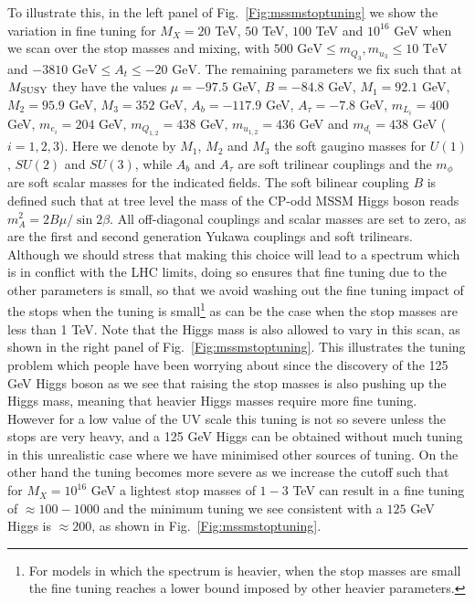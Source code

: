 \documentclass[preprint,amsmath,amssymb,aps,superscriptaddress,prd,showpacs,floatfix,nofootinbib]{revtex4-1}
\begin{document}
To illustrate this, in the left panel of Fig.~\ref{Fig:mssmstoptuning}
we show the variation in fine tuning for $M_X=20$ TeV, $50$ TeV, $100$
TeV and $10^{16}$ GeV when we scan over the stop masses and mixing,
with $500 \textrm{ GeV} \leq m_{Q_3},m_{u_3}\leq 10\textrm{ TeV}$ and
$-3810\textrm{ GeV}\leq A_t\leq -20\textrm{ GeV}$.  The remaining
parameters we fix such that at $M_{\rm SUSY}$ they have the values
$\mu=-97.5$ GeV, $B=-84.8$ GeV, $M_1=92.1$ GeV, $M_2=95.9$ GeV,
$M_3=352$ GeV, $A_b=-117.9$ GeV, $A_\tau=-7.8$ GeV, $m_{L_i}=400$ GeV,
$m_{e_i}=204$ GeV, $m_{Q_{1,2}}=438$ GeV, $m_{u_{1,2}}=436$ GeV and
$m_{d_i}=438$ GeV ($i=1,2,3$). Here we denote by $M_1$, $M_2$ and $M_3$
the soft gaugino masses for $U(1)$, $SU(2)$ and $SU(3)$, while $A_b$ and
$A_\tau$ are soft trilinear couplings and the $m_\phi$ are soft scalar
masses for the indicated fields. The soft bilinear
coupling $B$ is defined such that at tree level the mass of the CP-odd MSSM Higgs boson
reads $m_A^2=2B\mu/\sin 2\beta$. All off-diagonal couplings and scalar masses
are set to zero, as are the first and second generation Yukawa couplings
and soft trilinears. Although we should stress that making
this choice will lead to a spectrum which is in conflict with the LHC
limits, doing so ensures that fine tuning due to the other parameters
is small, so that we avoid washing out the fine tuning impact of the
stops when the tuning is small\footnote{For models in which the
  spectrum is heavier, when the stop masses are small the fine tuning
  reaches a lower bound imposed by other heavier parameters.} as can
be the case when the stop masses are less than 1 TeV.  Note that the
Higgs mass is also allowed to vary in this scan, as shown in the right
panel of Fig.~\ref{Fig:mssmstoptuning}. This illustrates the tuning
problem which people have been worrying about since the discovery of
the 125 GeV Higgs boson as we see that raising the stop masses is also
pushing up the Higgs mass, meaning that heavier Higgs masses require
more fine tuning.  However for a low value of the UV scale this tuning
is not so severe unless the stops are very heavy, and a 125 GeV Higgs
can be obtained without much tuning in this unrealistic case where we
have minimised other sources of tuning.  On the other hand the tuning
becomes more severe as we increase the cutoff such that for $M_X =
10^{16}$ GeV a lightest stop masses of $1-3$ TeV can result in a fine
tuning of $\approx 100 - 1000$ and the minimum tuning we see
consistent with a $125$ GeV Higgs is $\approx 200$, as shown in
Fig.~\ref{Fig:mssmstoptuning}.
\end{document}
